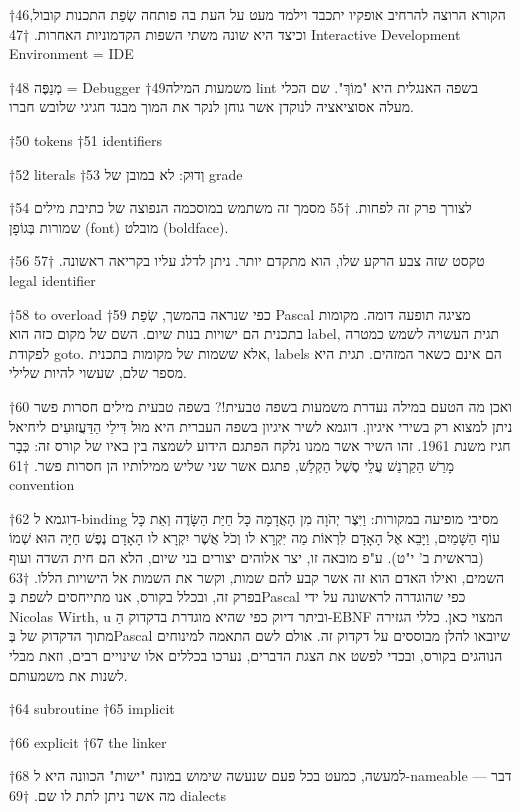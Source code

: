 †{46}הקורא הרוצה להרחיב אופקיו יתכבד וילמד מעט על העת בה פותחה שְׂפַת התכנות קובול, וכיצד היא שונה משתי השפות הקדמוניות האחרות.
†{47} Interactive Development Environment = IDE

†{48} מְנַפֶּה = Debugger
†{49}משמעות המילה lint בשפה האנגלית היא "מוֹךְ". שם הכלי מעלה אסוציאציה לנוקדן אשר גוחן לנקר את המוך מבגד חגיגי שלובש חברו.

†{50} tokens
†{51} identifiers

†{52} literals
†{53} וְדוּק: לא במובן של grade

†{54} לצורך פרק זה לפחות.
†{55} מסמך זה משתמש במוסכמה הנפוצה של כתיבת מילים שמורות בְּגוֹפָן (font) מובלט (boldface).

†{56} טקסט שזה צבע הרקע שלו, הוא מתקדם יותר. ניתן לדלג עליו בקריאה ראשונה.
†{57} legal identifier

†{58} to overload
†{59} כפי שנראה בהמשך, שְׂפַת Pascal מציגה תופעה דומה. מקומות בתכנית הם ישויות בנות שיום. השם של מקום כזה הוא label, תגית העשויה לשמש כמטרה לפקודת goto. אלא ששמות של מקומות בתכנית, labels הם אינם כשאר המזהים. תגית היא מספר שלם, שעשוי להיות שלילי.

†{60} ואכן מה הטעם במילה נעדרת משמעות בשפה טבעית!? בשפה טבעית מילים חסרות פשר ניתן למצוא רק בשירי איגיון. דוגמא לשיר איגיון בשפה העברית היא מוּל דִּילֵי הַדַּעֲזוּעִים ליחיאל חגיז משנת 1961. זהו השיר אשר ממנו נלקח הפתגם הידוע לשמצה בין באיו של קורס זה: כְּבָר מָרַשׁ הַקַרְנַשׁ עֲלֵי סֶשֶׁל הַקְלַשׁ, פתגם אשר שני שליש ממילותיו הן חסרות פשר.
†{61} convention

†{62} דוגמא ל-binding מסיבי מופיעה במקורות: וַיִּצֶר יְהֹוָה מִן הָאֲדָמָה כָּל חַיַּת הַשָּׂדֶה וְאֵת כָּל עוֹף הַשָּׁמַיִם, וַיָּבֵא אֶל הָאָדָם לִרְאוֹת מַה יִּקְרָא לו וְכֹל אֲשֶׁר יִקְרָא לו הָאָדָם נֶפֶשׁ חַיָּה הוּא שְׁמוֹ (בראשית ב' י"ט). ע"פ מובאה זו, יצר אלוהים יצורים בני שיום, הלא הם חית השדה ועוף השמים, ואילו האדם הוא זה אשר קבע להם שמות, וקשר את השמות אל הישויות הללו.
†{63} בפרק זה, ובכלל בקורס, אנו מתייחסים לשפת בְּPascal כפי שהוגדרה לראשונה על ידי Nicolas Wirth, u וביתר דיוק כפי שהיא מוגדרת בדקדוק הַ-EBNF המצוי כאן. כללי הגזירה מתוך הדקדוק של בְּPascal שיובאו להלן מבוססים על דקדוק זה. אולם לשם התאמה למינוחים הנוהגים בקורס, ובכדי לפשט את הצגת הדברים, נערכו בכללים אלו שינויים רבים, וזאת מבלי לשנות את משמעותם.

†{64} subroutine
†{65} implicit

†{66} explicit
†{67} the linker

†{68} למעשה, כמעט בכל פעם שנעשה שימוש במונח "ישות" הכוונה היא ל-nameable --- דבר מה אשר ניתן לתת לו שם.
†{69} dialects

